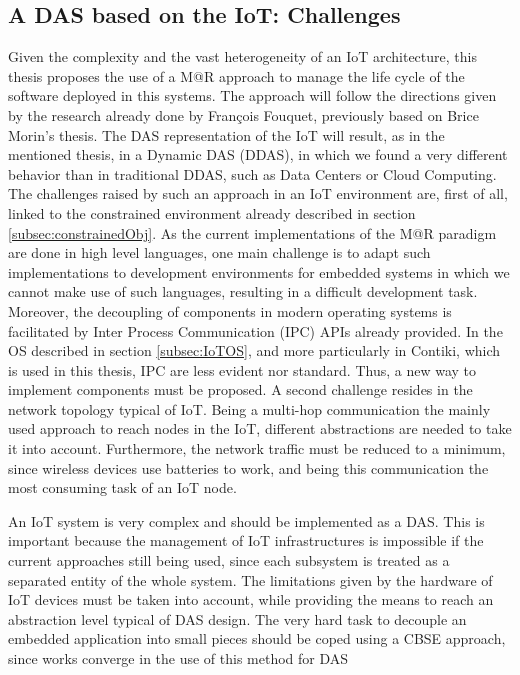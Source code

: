 \subsection{A DAS based on the IoT: Challenges}
Given the complexity and the vast heterogeneity of an IoT architecture, this thesis proposes the use of a M@R approach to manage the life cycle of the software deployed in this systems.
The approach will follow the directions given by the research already done by Fran{\c{c}}ois Fouquet\cite{fouquet2013kevoree}, previously based on Brice Morin's thesis\cite{morin2010leveraging}.
The DAS representation of the IoT will result, as in the mentioned thesis, in a Dynamic DAS (DDAS), in which we found a very different behavior than in traditional DDAS, such as Data Centers or Cloud Computing.
The challenges raised by such an approach in an IoT environment are, first of all, linked to the constrained environment already described in section \ref{subsec:constrainedObj}.
As the current implementations of the M@R paradigm are done in high level languages, one main challenge is to adapt such implementations to development environments for embedded systems in which we cannot make use of such languages, resulting in a difficult development task.
Moreover, the decoupling of components in modern operating systems is facilitated by Inter Process Communication (IPC) APIs already provided.
In the OS described in section \ref{subsec:IoTOS}, and more particularly in Contiki, which is used in this thesis, IPC are less evident nor standard.
Thus, a new way to implement components must be proposed.
A second challenge resides in the network topology typical of IoT.
Being a multi-hop communication the mainly used approach to reach nodes in the IoT, different abstractions are needed to take it into account.
Furthermore, the network traffic must be reduced to a minimum, since wireless devices use batteries to work, and being this communication the most consuming task of an IoT node.


An IoT system is very complex and should be implemented as a DAS.
This is important because the management of IoT infrastructures is impossible if the current approaches still being used, since each subsystem is treated as a separated entity of the whole system.
The limitations given by the hardware of IoT devices must be taken into account, while providing the means to reach an abstraction level typical of DAS design.
The very hard task to decouple an embedded application into small pieces should be coped using a CBSE approach, since works converge in the use of this method for DAS

